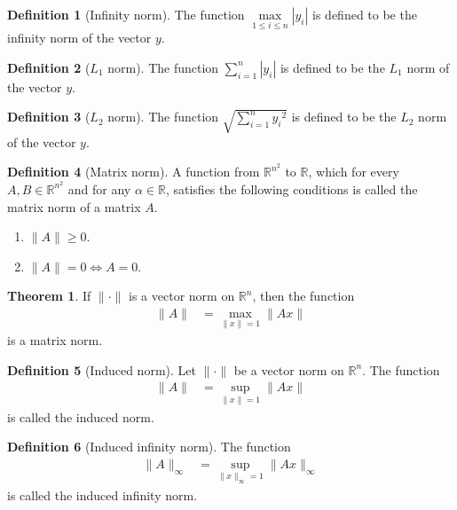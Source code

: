 \documentclass[fleqn, a4paper, 12pt, twoside, titlepage]{article}
\theoremstyle{definition}
\newtheorem{definition}{Definition}
\theoremstyle{theorem}
\newtheorem{theorem}{Theorem}
\begin{document}
\begin{definition}[Infinity norm]
	The function $\max\limits_{1 \le i \le n} |y_i|$ is defined to be the infinity norm of the vector $y$.
\end{definition}

\begin{definition}[$L_1$ norm]
	The function $\sum\limits_{i = 1}^{n} |y_i|$ is defined to be the $L_1$ norm of the vector $y$.
\end{definition}

\begin{definition}[$L_2$ norm]
	The function $\sqrt{\sum\limits_{i = 1}^{n} {y_i}^2}$ is defined to be the $L_2$ norm of the vector $y$.
\end{definition}

\begin{definition}[Matrix norm]
	A function from $\mathbb{R}^{n^2}$ to $\mathbb{R}$, which for every $A,B \in \mathbb{R}^{n^2}$ and for any $\alpha \in \mathbb{R}$, satisfies the following conditions is called the matrix norm of a matrix $A$.
	\begin{enumerate}
		\item $\|A\| \ge 0$.
		\item $\|A\| = 0 \iff A = 0$.
	\end{enumerate}
\end{definition}

\begin{theorem}
	If $\|\cdot\|$ is a vector norm on $\mathbb{R}^n$, then the function
	\begin{align*}
		\|A\| &= \max\limits_{\|x\| = 1} \|A x\|
	\end{align*}
	is a matrix norm.\\
\end{theorem}

\begin{definition}[Induced norm]
	Let $\|\cdot\|$ be a vector norm on $\mathbb{R}^n$.
	The function
	\begin{align*}
		\|A\| &= \sup\limits_{\|x\| = 1} \|A x\|
	\end{align*}
	is called the induced norm.
\end{definition}

\begin{definition}[Induced infinity norm]
	The function
	\begin{align*}
		\|A\|_{\infty} &= \sup\limits_{\|x\|_{\infty} = 1} \|A x\|_{\infty}
	\end{align*}
	is called the induced infinity norm.
\end{definition}
\end{document}
